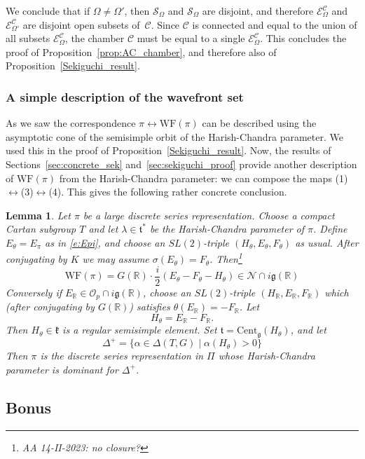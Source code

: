 \documentclass[10pt,leqno]{article}
\newtheorem{lemma}[equation]{Lemma}
\newcommand{\Cent}{\mathrm{Cent}}
\renewcommand{\O}{\mathcal O}
\newcommand{\R}{\mathbb R}
\newcommand{\N}{\mathcal N}
\renewcommand{\k}{\mathfrak k}
\renewcommand{\t}{\mathfrak t}
\newcommand{\g}{\mathfrak g}
\newcommand{\WF}{\mathrm{WF}}
\newcommand{\Op}{\O_p}
\newcommand{\ECom}{\mathcal{E}^{\mathcal{C}}_\Omega}
\begin{document}
We conclude that if $\Omega \neq \Omega'$, then $\mathcal{S}_\Omega$ and $\mathcal{S}_\Omega$ are disjoint, and therefore $\ECom$ and $\mathcal{E}^{\mathcal{C}}_{\Omega'}$ are disjoint open subsets of~$\mathcal{C}$. Since $\mathcal{C}$ is connected and equal to the union of all subsets $\mathcal{E}^{\mathcal{C}}_{\Omega}$, the chamber $\mathcal{C}$ must be equal to a single $\ECom$. This concludes the proof of Proposition~\ref{prop:AC_chamber}, and therefore also of Proposition~\ref{Sekiguchi_result}.


\subsubsection{A simple description of the wavefront set}\label{sec:alternate_WF}


As we saw the correspondence $\pi \leftrightarrow \WF(\pi)$ can be described using the asymptotic cone of the semisimple orbit of the Harish-Chandra parameter. We used this in the proof of Proposition~\ref{Sekiguchi_result}. Now, the results of Sections~\ref{sec:concrete_sek} and~\ref{sec:sekiguchi_proof} provide another description of $\WF(\pi)$ from the Harish-Chandra parameter: we can compose the maps (1)$\leftrightarrow$(3)$\leftrightarrow$(4). This gives the following rather concrete conclusion.

\begin{lemma}
  Let $\pi$ be a large discrete series representation.
Choose a compact Cartan subgroup $T$ and let $\lambda\in \t^*$ be the Harish-Chandra parameter of $\pi$.
Define $E_\theta=E_\pi$ as in \eqref{e:Epi}, and choose an $SL(2)$-triple $(H_\theta,E_\theta,F_\theta)$ as usual.
After conjugating by $K$ we may assume $\sigma(E_\theta)=F_\theta$.  Then\footnote{AA 14-II-2023: no closure?}
$$
\WF(\pi)=G(\R)\cdot\frac i2(E_\theta-F_\theta-H_\theta)\in\N\cap i\g(\R)
$$
Conversely if $E_\R\in \Op\cap i\g(\R)$, choose an $SL(2)$-triple $(H_\R,E_\R,F_\R)$ which (after conjugating by $G(\R)$) satisfies $\theta(E_\R)=-F_\R$.
Let
$$
H_\theta=E_\R-F_\R.
$$
Then $H_\theta\in\k$ is a regular semisimple element.
Set $\t=\Cent_{\g}(H_\theta)$, and let
$$
\Delta^+=\{\alpha\in\Delta(T,G)\mid  \alpha(H_\theta)>0\}
$$
Then $\pi$ is the discrete series representation in $\Pi$ whose Harish-Chandra parameter is dominant for $\Delta^+$. 
\end{lemma}

\subsection{Bonus}
\end{document}
